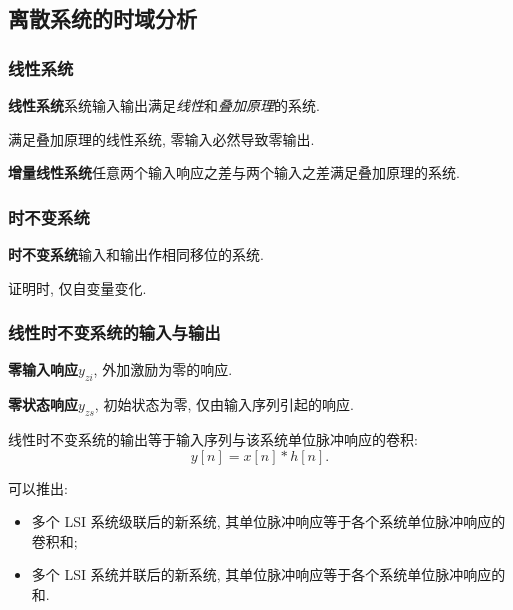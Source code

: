 \subsection{离散系统的时域分析}
\subsubsection{线性系统}
\textbf{线性系统}\quad 系统输入输出满足\textit{线性}和\textit{叠加原理}的系统.

满足叠加原理的线性系统, 零输入必然导致零输出.

\textbf{增量线性系统}\quad 任意两个输入响应之差与两个输入之差满足叠加原理的系统.

\subsubsection{时不变系统}
\textbf{时不变系统}\quad 输入和输出作相同移位的系统.

证明时, 仅自变量变化.

\subsubsection{线性时不变系统的输入与输出}
\textbf{零输入响应}\quad $y_{zi}$, 外加激励为零的响应.

\textbf{零状态响应}\quad $y_{zs}$, 初始状态为零, 仅由输入序列引起的响应.

线性时不变系统的输出等于输入序列与该系统单位脉冲响应的卷积:
\begin{equation}
    y[n]=x[n]*h[n].
\end{equation}

可以推出:
\begin{itemize}
    \item 多个 LSI 系统级联后的新系统, 其单位脉冲响应等于各个系统单位脉冲响应的卷积和;
    \item 多个 LSI 系统并联后的新系统, 其单位脉冲响应等于各个系统单位脉冲响应的和.
\end{itemize}
